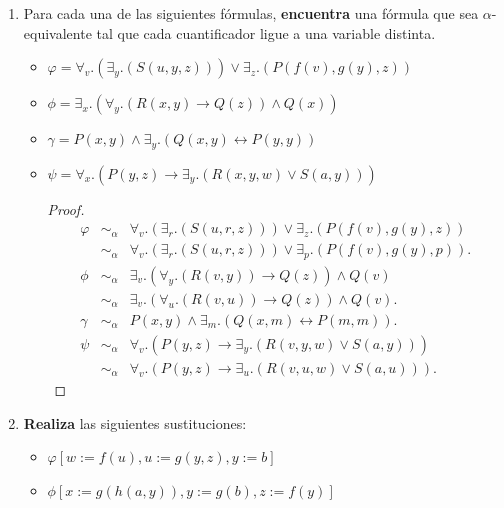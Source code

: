 \documentclass{article}
\begin{document}
\begin{enumerate}
\item Para cada una de las siguientes fórmulas, \textbf{encuentra} una
  fórmula que sea $ \alpha$-equivalente tal que cada cuantificador ligue a una
  variable distinta.
  \newcommand{\localtextbulletone}{\textcolor{black}{\raisebox{.45ex}{\rule{.6ex}{.6ex}}}}
  \renewcommand{\labelitemi}{\localtextbulletone}
  \begin{itemize}
  \item $\varphi = \forall_{v}. (\exists_{y}.(S(u,y,z))) \lor \exists_{z}.(P(f(v), g(y), z))$
  \item $\phi = \exists_{x}.(\forall_{y}.(R(x,y) \rightarrow Q(z)) \land Q(x))$
  \item $\gamma = P(x,y) \land \exists_{y}.(Q(x,y) \leftrightarrow P(y,y))$
  \item $\psi = \forall_{x}.(P(y,z) \rightarrow \exists_{y}.(R(x,y,w) \lor S(a,y)))$
    \begin{proof}
      \begin{eqnarray*}
        \varphi &\sim_{\alpha}& \forall_{v}. (\exists_{r}.(S(u,r,z))) \lor \exists_{z}.(P(f(v), g(y), z))\\
        &\sim_{\alpha}& \forall_{v}. (\exists_{r}.(S(u,r,z))) \lor \exists_{p}.(P(f(v), g(y), p)).\\
        \phi &\sim_{\alpha}& \exists_{v}. (\forall_{y}. (R(v,y)) \rightarrow Q(z)) \land Q(v)\\
        &\sim_{\alpha}& \exists_{v}. (\forall_{u}. (R(v,u)) \rightarrow Q(z)) \land Q(v).\\
        \gamma &\sim_{\alpha}& P(x,y) \land \exists_{m}.(Q(x, m) \leftrightarrow P(m,m)).\\
        \psi &\sim_{\alpha}& \forall_{v}.(P(y,z) \rightarrow \exists_{y}.(R(v, y, w) \lor S(a,y)))\\
        &\sim_{\alpha}& \forall_{v}.(P(y,z) \rightarrow \exists_{u}.(R(v, u, w) \lor S(a,u))).
      \end{eqnarray*}
    \end{proof}
  \end{itemize}
\item \textbf{Realiza} las siguientes sustituciones:
  \begin{itemize}
  \item $\varphi [w := f(u), u := g(y, z), y := b]$
  \item $\phi[x := g(h(a,y)), y := g(b), z := f(y)]$

\end{itemize}
\end{enumerate}
\end{document}
